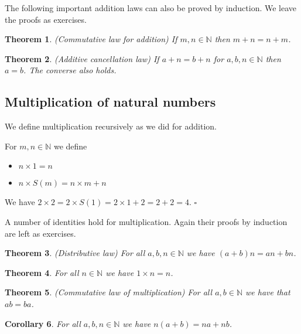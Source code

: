 \documentclass[10pt]{article}
\newcommand{\N}{\mathbb{N}}
\newcommand{\qed}{\square}
\newtheorem{theorem}{Theorem}[section]
\newtheorem{corollary}[theorem]{Corollary}
\newenvironment{definition}[1][Definition]{\begin{trivlist}
\item[\hskip \labelsep {\bfseries #1}]}{\end{trivlist}}
\newenvironment{example}[1][Example]{\begin{trivlist}
\item[\hskip \labelsep {\bfseries #1}]}{\end{trivlist}}
\begin{document}
The following important addition laws can also be proved by induction. We leave the proofs as exercises.

\begin{theorem} (Commutative law for addition)
If $m, n \in \N$ then $m + n = n + m$.
\end{theorem}

\begin{theorem} (Additive cancellation law)
If $a + n = b + n$ for $a, b, n \in \N$ then $a = b$. The converse also holds.
\end{theorem}

\subsection{Multiplication of natural numbers}

We define multiplication recursively as we did for addition.

\begin{definition}
For $m, n \in \N$ we define 
\begin{itemize}
\item $n\times 1 = n$
\item $n\times S(m) = n\times m + n$
\end{itemize}
\end{definition}

\begin{example}
We have $2\times 2 = 2\times S(1) = 2\times 1 + 2 = 2 + 2 = 4$. $\qed$
\end{example}

A number of identities hold for multiplication. Again their proofs by induction are left as exercises.

\begin{theorem} (Distributive law)
For all $a, b, n \in \N$ we have $(a + b)n = an + bn$.
\end{theorem}


\begin{theorem}
For all $n \in \N$ we have $1\times n = n$.
\end{theorem}

\begin{theorem} (Commutative law of multiplication)
For all $a, b \in \N$ we have that $ab = ba$.
\end{theorem}

\begin{corollary}
For all $a, b, n \in \N$ we have $n(a + b) = na + nb$.
\end{corollary}
\end{document}
